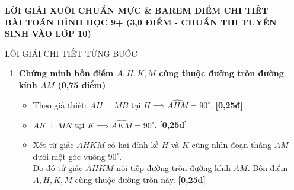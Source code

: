 \documentclass[11pt,a4paper]{article}
\begin{document}
\newpage

\begin{center}
    {\Large\bfseries\color{blue!80!black} LỜI GIẢI XUÔI CHUẨN MỰC \& BAREM ĐIỂM CHI TIẾT}\\[1.5mm]
    {\large\bfseries BÀI TOÁN HÌNH HỌC 9+ (3,0 ĐIỂM - CHUẨN THI TUYỂN SINH VÀO LỚP 10)}
\end{center}

\vspace{1mm}

\begin{solutionbox}{LỜI GIẢI CHI TIẾT TỪNG BƯỚC}
\begin{enumerate}[label=\textbf{\arabic*.}, leftmargin=*]
    \item \textbf{Chứng minh bốn điểm $A, H, K, M$ cùng thuộc đường tròn đường kính $AM$ (0,75 điểm)}
    \begin{itemize}[leftmargin=*, nosep]
        \item Theo giả thiết: $AH \perp MB$ tại $H \implies \widehat{AHM} = 90^\circ$. \hfill \textbf{[0,25đ]}
        \item $AK \perp MN$ tại $K \implies \widehat{AKM} = 90^\circ$. \hfill \textbf{[0,25đ]}
        \item Xét tứ giác $AHKM$ có hai đỉnh kề $H$ và $K$ cùng nhìn đoạn thẳng $AM$ dưới một góc vuông $90^\circ$.\\
        Do đó tứ giác $AHKM$ nội tiếp đường tròn đường kính $AM$. Bốn điểm $A, H, K, M$ cùng thuộc đường tròn này. \hfill \textbf{[0,25đ]}
    \end{itemize}


\end{enumerate}
\end{solutionbox}
\end{document}
